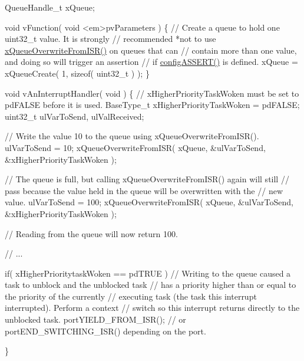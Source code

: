 \begin{DoxyPre} QueueHandle\_t xQueue;\end{DoxyPre}



\begin{DoxyPre} void vFunction( void <em>pvParameters )
 \{
    // Create a queue to hold one uint32\_t value.  It is strongly
    // recommended *not to use \hyperlink{queue_8h_abdcd6a86ef82034d002193e79cfd3ce8}{xQueueOverwriteFromISR()} on queues that can
    // contain more than one value, and doing so will trigger an assertion
    // if \hyperlink{_free_r_t_o_s_config_8h_a228c70cd48927d6ab730ed1a6dfbe35f}{configASSERT()} is defined.
    xQueue = xQueueCreate( 1, sizeof( uint32\_t ) );
\}\end{DoxyPre}



\begin{DoxyPre}void vAnInterruptHandler( void )
\{
// xHigherPriorityTaskWoken must be set to pdFALSE before it is used.
BaseType\_t xHigherPriorityTaskWoken = pdFALSE;
uint32\_t ulVarToSend, ulValReceived;
\begin{DoxyVerb}// Write the value 10 to the queue using xQueueOverwriteFromISR().
ulVarToSend = 10;
xQueueOverwriteFromISR( xQueue, &ulVarToSend, &xHigherPriorityTaskWoken );

// The queue is full, but calling xQueueOverwriteFromISR() again will still
// pass because the value held in the queue will be overwritten with the
// new value.
ulVarToSend = 100;
xQueueOverwriteFromISR( xQueue, &ulVarToSend, &xHigherPriorityTaskWoken );

// Reading from the queue will now return 100.

// ...

if( xHigherPrioritytaskWoken == pdTRUE )
{
    // Writing to the queue caused a task to unblock and the unblocked task
    // has a priority higher than or equal to the priority of the currently
    // executing task (the task this interrupt interrupted).  Perform a context
    // switch so this interrupt returns directly to the unblocked task.
    portYIELD_FROM_ISR(); // or portEND_SWITCHING_ISR() depending on the port.
}
\end{DoxyVerb}

\}
 \end{DoxyPre}
 